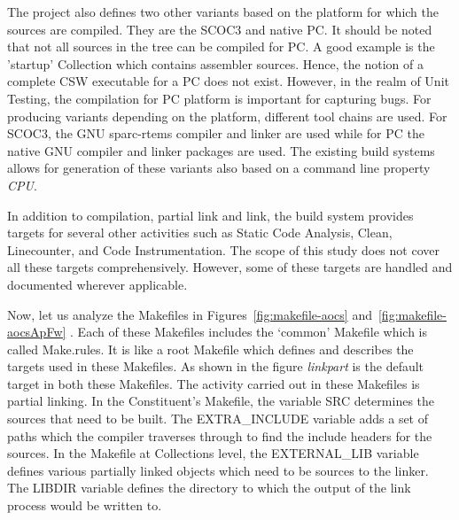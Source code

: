 \documentclass[12pt, a4paper, titlepage]{scrartcl}
\newcommand{\courierword}[1]{\textsf{\itshape #1}}{\fontfamily{pcr}\selectfont}%
\begin{document}
\par The project also defines two other variants based on the platform for which the sources are compiled. They are the SCOC3\cite{koebel2010scoc3} and native PC. It should be noted that not all sources in the tree can be compiled for PC. A good example is the 'startup' Collection which contains assembler sources. Hence, the notion of a complete CSW executable for a PC does not exist. However, in the realm of Unit Testing, the compilation for PC platform is  important for capturing bugs. For producing variants depending on the platform, different tool chains are used. For SCOC3, the GNU sparc-rtems compiler and linker are used while for PC the native GNU compiler and linker packages are used. The existing build systems allows for generation of these variants also based on a command line property \courierword{CPU}.
\par In addition to compilation, partial link and link, the build system provides targets for several other activities such as Static Code Analysis, Clean, Linecounter, and Code Instrumentation. The scope of this study does not cover all these targets comprehensively. However, some of these targets are handled and documented wherever applicable. 
\par Now, let us analyze the Makefiles in Figures~\ref{fig:makefile-aocs} and~\ref{fig:makefile-aocsApFw} . Each of these Makefiles includes the ‘common’ Makefile which is called Make.rules. It is like a root Makefile which defines and describes the targets used in these Makefiles. As shown in the figure \courierword{linkpart} is the default target in both these Makefiles. The activity carried out in these Makefiles is partial linking. In the Constituent's Makefile, the variable SRC determines the sources that need to be built. The EXTRA\_INCLUDE variable adds a set of paths which the compiler traverses through to find the include headers for the sources. In the Makefile at Collections level, the EXTERNAL\_LIB variable defines various partially linked objects which need to be sources to the linker. The LIBDIR variable defines the directory to which the output of the link process would be written to.
\end{document}
